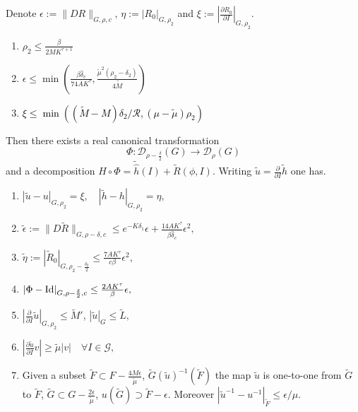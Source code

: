 \begin{lemma}
Denote $\epsilon:=\|DR\|_{G,\rho,c}$, $\eta:=|R_0|_{G,\rho_2}$ and $\xi:=\left|\frac{\partial R_0}{\partial I}\right|_{G,\rho_2}$.
\begin{enumerate}
\item\label{eq:inductive_lemma_1} $\rho_2 \leq \frac{\beta}{2MK^{\tau+1}}$
\item\label{eq:inductive_lemma_2} $\epsilon \leq \min\left(\frac{\beta \hat \delta_c}{74 A K^\tau},\frac{\tilde\mu^2(\rho_2-\delta_2)}{4\tilde M}\right)$
\item\label{eq:inductive_lemma_3} \textcolor{black}{$\xi \leq \min\left((\tilde M - M)\delta_2/\mathcal{R}, (\mu - \tilde \mu)\rho_2\right)$}
\end{enumerate}
Then there exists a real canonical transformation $$\Phi:\mathcal{D}_{\rho-\frac{\delta}{2}}(G)\rightarrow \mathcal{D}_\rho(G)$$
 and a decomposition $H\circ\Phi = \tilde{\hat h}(I) + \tilde R (\phi,I)$. Writing $\tilde u = \frac{\partial}{\partial I} \tilde h$ one has.
\begin{enumerate}
\item $|\tilde u - u|_{G,\rho_2}=\xi, \quad |\tilde h - h|_{G,\rho_2} = \eta,$
\item $\tilde \epsilon := \|D\tilde R \|_{G,\rho-\delta,c}\leq e^{-K\delta_1}\epsilon + \frac{14AK^\tau}{\beta\hat\delta_c}\epsilon^2,$
\item $\tilde \eta := |\tilde R_0|_{G,\rho_2-\frac{\delta_2}{2}}\leq\frac{7AK^\tau}{c\beta}\epsilon^2,$
\item $|\Phi -\text{Id}|_{G,\rho-\frac{\delta}{2},c}\leq\frac{2AK^\tau}{\beta}\epsilon,$
\item $\left|\frac{\partial}{\partial I} \tilde u\right|_{G,\rho_2} \leq \tilde M'$, $|\tilde u|_G\leq \tilde L,$
\item $|\frac{\partial \tilde u}{\partial I}v| \geq \tilde \mu |v| \quad \forall I \in \mathcal{G},$
\item Given a subset $\tilde F \subset F -\frac{4M\epsilon}{\tilde \mu}$, $\tilde G (\tilde u)^{-1}(\tilde F)$ the map $\tilde u$ is one-to-one from $\tilde G$ to $\tilde F$, $\tilde G \subset G -\frac{2\epsilon}{\tilde \mu}$, $u(\tilde G) \supset \tilde F -\epsilon$. Moreover $|\tilde u^{-1} - u^{-1}|_{\tilde F} \leq \epsilon/\mu$.
\end{enumerate}

\end{lemma}


